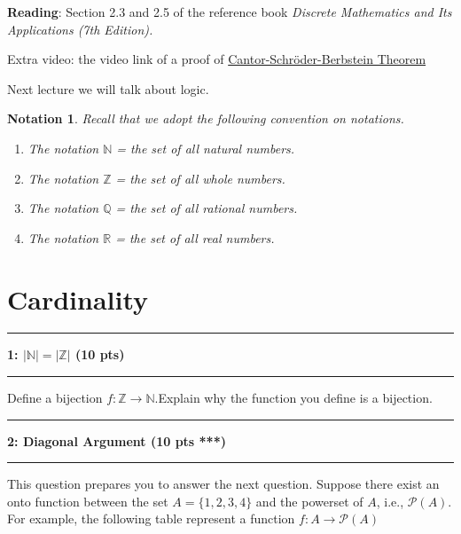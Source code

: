 \documentclass[11pt]{article}
\newcommand\question[2]{\vspace{.25in}\hrule\textbf{#1: #2}\vspace{.5em}\hrule\vspace{.10in}}
\newtheorem{notation}[theorem]{Notation}
\newcommand{\Q}{\mathbb{Q}}
\newcommand{\R}{\mathbb{R}}
\newcommand{\Z}{\mathbb{Z}}
\newcommand{\N}{\mathbb{N}}
\begin{document}
\raggedright
\newcommand\NAME{Xiang Huang}  %
\newcommand\UISID{\texttt{UISid}}     %
\newcommand\HWNUM{3}              %



\textbf{Reading}: Section 2.3 and 2.5 of the reference book \textit{Discrete Mathematics and Its Applications (7th Edition).}

 Extra video: the video link of a proof of \href{https://www.youtube.com/watch?v=IkoKttTDuxE}{Cantor-Schr\"oder-Berbstein Theorem}

Next lecture we will talk about logic.

\begin{notation}
Recall that we adopt the following convention on notations.
\begin{enumerate}
    \item The notation $\N$ = the set of all natural numbers.
    \item The notation $\Z$ = the set of all whole numbers.
    \item The notation $\Q$ = the set of all rational numbers.
    \item The notation $\R$ = the set of all real numbers.
\end{enumerate}
\end{notation}
\section{Cardinality}
\question{1}{$|{\N}|= |{\Z}|$ (10 pts)}
Define a bijection $f:\Z \to \N$.Explain why the function you define is a bijection.


\question{2} {Diagonal Argument (10 pts ***)}
This question prepares you to answer the next question.
Suppose there exist an onto function between the set $A=\{1,2,3,4\}$ and the powerset of $A$, i.e., $\mathcal{P}(A)$. For example, the following table represent a function $f:A\to \mathcal{P}(A)$
\end{document}
